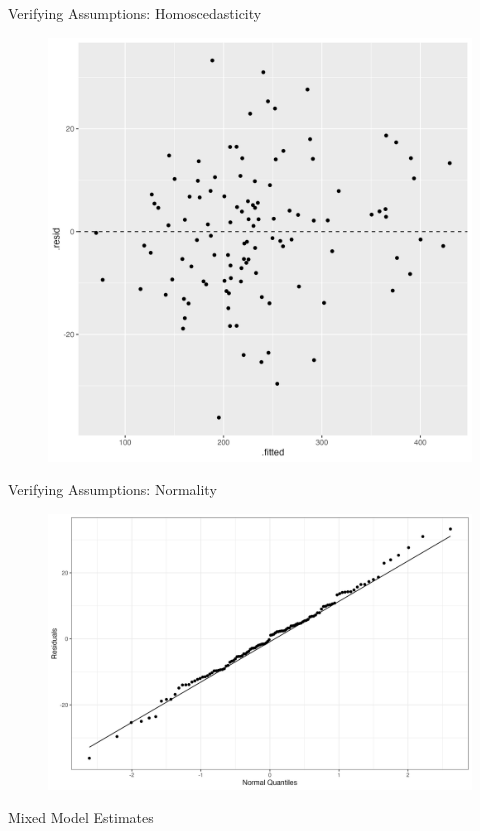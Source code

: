 \documentclass{beamer}
\begin{document}
\begin{frame}{Verifying Assumptions: Homoscedasticity}
    \begin{figure}
        \centering
        \includegraphics[width=0.75\linewidth]{report/figures/presentation/homoscedasticity.png}
    \end{figure}
\end{frame}

\begin{frame}{Verifying Assumptions: Normality}
    \begin{figure}
        \centering
        \includegraphics[width=\linewidth]{report/figures/presentation/qqplot.png}
    \end{figure}
\end{frame}

\begin{frame}{Mixed Model Estimates}
    
\end{frame}
\end{document}
